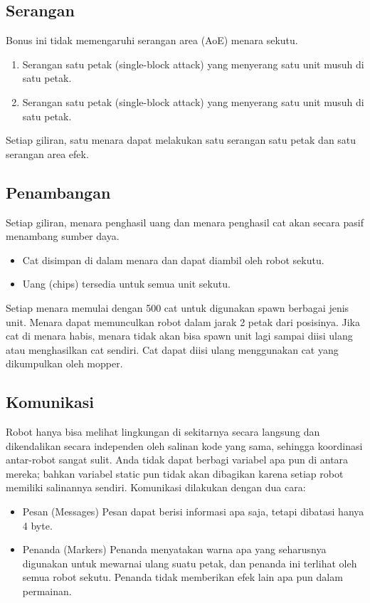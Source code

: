 \subsection{Serangan}
Bonus ini tidak memengaruhi serangan area (AoE) menara sekutu.
\begin{enumerate}
    \item Serangan satu petak (single-block attack) yang menyerang satu unit musuh di satu petak.
    \item Serangan satu petak (single-block attack) yang menyerang satu unit musuh di satu petak.
\end{enumerate}
Setiap giliran, satu menara dapat melakukan satu serangan satu petak dan satu serangan area efek.

\subsection{Penambangan}
Setiap giliran, menara penghasil uang dan menara penghasil cat akan secara pasif menambang sumber daya.
\begin{itemize}
    \item Cat disimpan di dalam menara dan dapat diambil oleh robot sekutu.
    \item Uang (chips) tersedia untuk semua unit sekutu.
\end{itemize}
Setiap menara memulai dengan 500 cat untuk digunakan spawn berbagai jenis unit. Menara dapat memunculkan robot dalam jarak 2 petak dari posisinya. Jika cat di menara habis, menara tidak akan bisa spawn unit lagi sampai diisi ulang atau menghasilkan cat sendiri. Cat dapat diisi ulang menggunakan cat yang dikumpulkan oleh mopper.

\subsection{Komunikasi}
Robot hanya bisa melihat lingkungan di sekitarnya secara langsung dan dikendalikan secara independen oleh salinan kode yang sama, sehingga koordinasi antar-robot sangat sulit. Anda tidak dapat berbagi variabel apa pun di antara mereka; bahkan variabel static pun tidak akan dibagikan karena setiap robot memiliki salinannya sendiri.
Komunikasi dilakukan dengan dua cara:
\begin{itemize}
    \item Pesan (Messages) Pesan dapat berisi informasi apa saja, tetapi dibatasi hanya 4 byte.
    \item Penanda (Markers) Penanda menyatakan warna apa yang seharusnya digunakan untuk mewarnai ulang suatu petak, dan penanda ini terlihat oleh semua robot sekutu. Penanda tidak memberikan efek lain apa pun dalam permainan.
\end{itemize}

